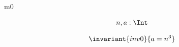 \documentclass[12pt]{amsart}
\title{}
\author{}
\date{} %
\begin{document}
\maketitle
\tableofcontents


\begin{machine}{m0}

	\begin{align*}
\variable{		n,a : \Int}
	\end{align*}



\begin{align*}
\invariant{inv0}
{	a = n^3	}
\end{align*}
%



\end{machine}
\end{document}
